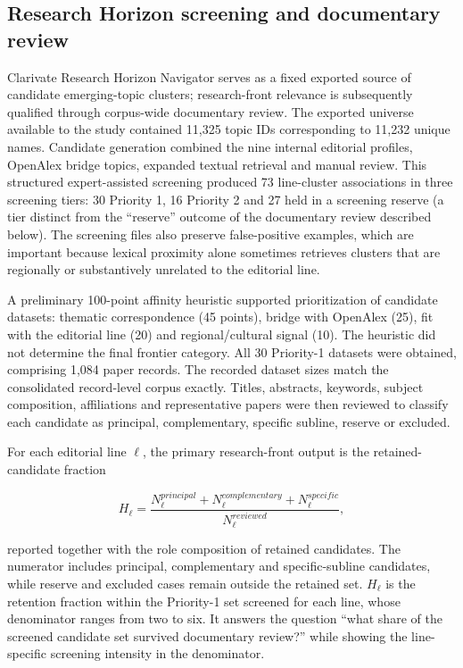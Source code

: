\documentclass[futureinternet,article,submit,moreauthors]{Definitions/mdpi}
\begin{document}
\subsection{Research Horizon screening and documentary review}\label{subsec:rhmethod}

Clarivate Research Horizon Navigator serves as a fixed exported source of candidate emerging-topic clusters; research-front relevance is subsequently qualified through corpus-wide documentary review. The exported universe available to the study contained 11,325 topic IDs corresponding to 11,232 unique names. Candidate generation combined the nine internal editorial profiles, OpenAlex bridge topics, expanded textual retrieval and manual review. This structured expert-assisted screening produced 73 line-cluster associations in three screening tiers: 30 Priority 1, 16 Priority 2 and 27 held in a screening reserve (a tier distinct from the ``reserve'' outcome of the documentary review described below). The screening files also preserve false-positive examples, which are important because lexical proximity alone sometimes retrieves clusters that are regionally or substantively unrelated to the editorial line.

A preliminary 100-point affinity heuristic supported prioritization of candidate datasets: thematic correspondence (45 points), bridge with OpenAlex (25), fit with the editorial line (20) and regional/cultural signal (10). The heuristic did not determine the final frontier category. All 30 Priority-1 datasets were obtained, comprising 1,084 paper records. The recorded dataset sizes match the consolidated record-level corpus exactly. Titles, abstracts, keywords, subject composition, affiliations and representative papers were then reviewed to classify each candidate as principal, complementary, specific subline, reserve or excluded.

For each editorial line $\ell$, the primary research-front output is the retained-candidate fraction

\begin{equation}
H_{\ell}=\frac{N^{principal}_{\ell}+N^{complementary}_{\ell}+N^{specific}_{\ell}}{N^{reviewed}_{\ell}},
\label{eq:rhretention}
\end{equation}

reported together with the role composition of retained candidates. The numerator includes principal, complementary and specific-subline candidates, while reserve and excluded cases remain outside the retained set. $H_{\ell}$ is the retention fraction within the Priority-1 set screened for each line, whose denominator ranges from two to six. It answers the question ``what share of the screened candidate set survived documentary review?'' while showing the line-specific screening intensity in the denominator.
\end{document}
